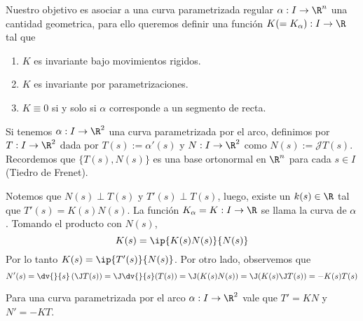 \documentclass{article}
\begin{document}
\noindent Nuestro objetivo es asociar a una curva parametrizada regular $\alpha: I\to\R^{n}$ una cantidad 
geometrica, para ello queremos definir una función $K(=K_{\alpha}): I\to\R$ tal que
\begin{enumerate}
    \item $K$ es invariante bajo movimientos rigidos.
    \item $K$ es invariante por parametrizaciones.
    \item $K\equiv0$ si y solo si $\alpha$ corresponde a un segmento de recta.
\end{enumerate}

\noindent Si tenemos $\alpha: I\to\R^{2}$ una curva parametrizada por el arco, definimos por $T: I\to\R^{2}$ 
dada por $T(s):=\alpha'(s)$ y $N: I\to\R^{2}$ como $N(s):=\mathcal{J}T(s)$. Recordemos que 
$\{T(s),N(s)\}$ es una base ortonormal en $\R^{n}$ para cada $s\in I$ (Tiedro de Frenet).
\vspace{4mm}

\noindent Notemos que $N(s)\perp T(s)$ y $T'(s)\perp T(s)$, luego, existe un $k(s)\in\R$ tal que 
$T'(s)=K(s)N(s)$. La función $K_{\alpha}=K: I\to\R$ se llama la curva de $\alpha$. Tomando el 
producto con $N(s)$,
\begin{equation*}
    K(s)=\ip{K(s)N(s)}{N(s)}
\end{equation*}
Por lo tanto $K(s)=\ip{T'(s)}{N(s)}$. Por otro lado, observemos que
\begin{equation*}
    N'(s)=\dv{}{s}\left(\J T(s)\right)=\J\dv{}{s}(T(s))=\J(K(s)N(s))=\J(K(s)\J T(s))=-K(s)T(s)
\end{equation*}

\begin{prop}
    Para una curva parametrizada por el arco $\alpha: I\to\R^{2}$ vale que $T'=KN$ y $N'=-KT$.
\end{prop}
\end{document}

